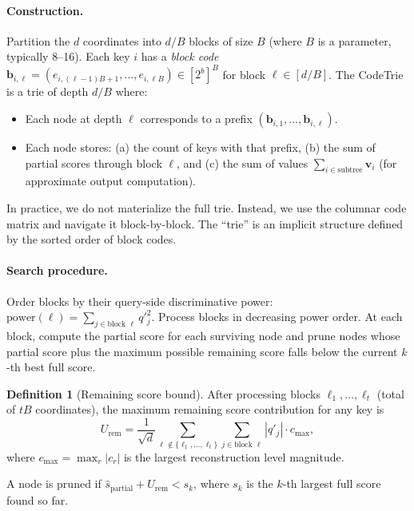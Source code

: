 \documentclass[10pt,twocolumn]{article}
\theoremstyle{definition}
\newtheorem{definition}[theorem]{Definition}
\newcommand{\bv}{\mathbf{v}}
\begin{document}
\paragraph{Construction.}
Partition the $d$ coordinates into $d/B$ blocks of size $B$ (where $B$ is a
parameter, typically 8--16).  Each key $i$ has a \emph{block code}
$\mathbf{b}_{i,\ell} = (e_{i,(\ell-1)B+1}, \ldots, e_{i,\ell B}) \in [2^b]^B$
for block $\ell \in [d/B]$.  The CodeTrie is a trie of depth $d/B$ where:
\begin{itemize}[nosep]
  \item Each node at depth $\ell$ corresponds to a prefix
        $(\mathbf{b}_{i,1}, \ldots, \mathbf{b}_{i,\ell})$.
  \item Each node stores: (a) the count of keys with that prefix, (b) the
        sum of partial scores through block $\ell$, and (c) the sum of values
        $\sum_{i \in \text{subtree}} \bv_i$ (for approximate output computation).
\end{itemize}

In practice, we do not materialize the full trie.  Instead, we use the columnar
code matrix and navigate it block-by-block.  The ``trie'' is an implicit
structure defined by the sorted order of block codes.

\paragraph{Search procedure.}
Order blocks by their query-side discriminative power:
$\text{power}(\ell) = \sum_{j \in \text{block }\ell} q'^2_j$.  Process blocks
in decreasing power order.  At each block, compute the partial score for each
surviving node and prune nodes whose partial score plus the maximum possible
remaining score falls below the current $k$-th best full score.

\begin{definition}[Remaining score bound]
  \label{def:remaining_bound}
  After processing blocks $\ell_1, \ldots, \ell_t$ (total of $tB$ coordinates),
  the maximum remaining score contribution for any key is
  \begin{equation}
    U_{\text{rem}} = \frac{1}{\sqrt{d}} \sum_{\ell \notin \{\ell_1,\ldots,\ell_t\}}
      \sum_{j \in \text{block }\ell} |q'_j| \cdot c_{\max},
  \end{equation}
  where $c_{\max} = \max_{r} |c_r|$ is the largest reconstruction level
  magnitude.
\end{definition}

A node is pruned if $\hat{s}_{\text{partial}} + U_{\text{rem}} < s_k$, where
$s_k$ is the $k$-th largest full score found so far.
\end{document}
